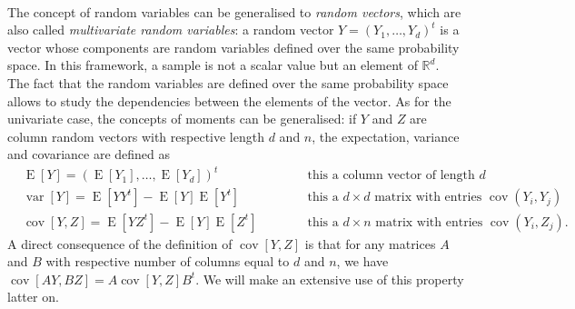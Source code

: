 \documentclass[twoside,openright]{report}
\DeclareMathOperator*{\Var}{var}
\DeclareMathOperator*{\E}{E}
\DeclareMathOperator*{\Cov}{cov}
\begin{document}
\paragraph{}
The concept of random variables can be generalised to \emph{random vectors}, which are also called \emph{multivariate random variables}: a random vector $Y=(Y_1,\dots,Y_d)^t$ is a vector whose components are random variables defined over the same probability space. In this framework, a sample is not a scalar value but an element of $\mathds{R}^d$. The fact that the random variables are defined over the same probability space allows to study the dependencies between the elements of the vector. As for the univariate case, the concepts of moments can be generalised: if $Y$ and $Z$ are column random vectors with respective length $d$ and $n$, the expectation, variance and covariance are defined as
\begin{align}
        &\E[Y]=(\E[Y_1],\dots,\E[Y_d])^t &\qquad &\text{ this a column vector of length }d\\ 
        &\Var[Y]= \E[Y Y^t] - \E[Y] \E[Y^t] &\qquad &\text{ this a $d \times d$ matrix with entries } \Cov(Y_i,Y_j)\\ 
        &\Cov[Y,Z]= \E[Y Z^t] - \E[Y] \E[Z^t] &\qquad &\text{ this a $d \times n$ matrix with entries } \Cov(Y_i,Z_j).
\end{align}
A direct consequence of the definition of $\Cov[Y,Z]$ is that for any matrices $A$ and $B$ with respective number of columns equal to $d$ and $n$, we have $\Cov[AY,BZ] = A \Cov[Y,Z] B^t$. We will make an extensive use of this property latter on.
\end{document}
